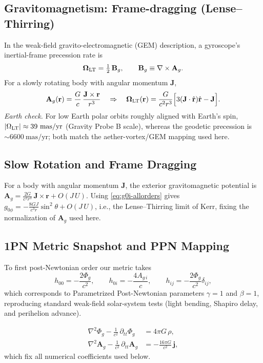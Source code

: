 \subsection*{Gravitomagnetism: Frame-dragging (Lense--Thirring)}
\label{sec:gm-frame-dragging}

In the weak-field gravito-electromagnetic (GEM) description, a gyroscope’s
inertial-frame precession rate is
\[
\boldsymbol{\Omega}_{\rm LT} = \tfrac{1}{2}\,\mathbf{B}_g,
\qquad
\mathbf{B}_g \equiv \nabla \times \mathbf{A}_g.
\]
For a slowly rotating body with angular momentum $\mathbf{J}$,
\[
\mathbf{A}_g(\mathbf{r}) = \frac{G}{c}\,\frac{\mathbf{J}\times\mathbf{r}}{r^3}
\quad\Rightarrow\quad
\boldsymbol{\Omega}_{\rm LT}(\mathbf{r}) =
\frac{G}{c^2 r^3}\Big[3(\mathbf{J}\cdot\hat{\mathbf r})\hat{\mathbf r}-\mathbf{J}\Big].
\]
\textit{Earth check.} For low Earth polar orbits roughly aligned with Earth’s spin,
$|\Omega_{\rm LT}|\approx 39~\mathrm{mas/yr}$ (Gravity Probe B scale), whereas the geodetic
precession is $\sim 6600~\mathrm{mas/yr}$; both match the aether-vortex/GEM mapping used here.


\subsection{Slow Rotation and Frame Dragging}
\label{sec:slow-rotation}
For a body with angular momentum $\mathbf J$, the exterior gravitomagnetic potential is
$\mathbf A_g=\tfrac{2G}{c^2 r^3}\,\mathbf J\times\mathbf r+O(J\,U)$.
Using \eqref{eq:g0i-allorders} gives $g_{0\phi}=-\tfrac{8GJ}{c^3 r}\sin^2\theta+O(J\,U)$,
i.e., the Lense--Thirring limit of Kerr, fixing the normalization of $\mathbf A_g$ used here.

\subsection*{1PN Metric Snapshot and PPN Mapping}
To first post-Newtonian order our metric takes
\[
h_{00}=-\frac{2\Phi_g}{c^2},\qquad h_{0i}=-\frac{4 A_{g\,i}}{c},\qquad h_{ij}=-\frac{2\Phi_g}{c^2}\delta_{ij},
\]
which corresponds to Parametrized Post-Newtonian parameters
$\gamma=1$ and $\beta=1$, reproducing standard weak-field solar-system tests (light bending, Shapiro delay, and perihelion advance).


\begin{align}
\nabla^2 \Phi_g - \frac{1}{c^2}\,\partial_{tt}\Phi_g &= 4\pi G\,\rho,\\
\nabla^2 \mathbf{A}_g - \frac{1}{c^2}\,\partial_{tt}\mathbf{A}_g &= -\frac{16\pi G}{c^2}\,\mathbf{j},
\end{align}
which fix all numerical coefficients used below.


